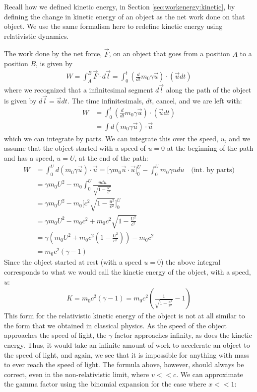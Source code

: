Recall how we defined kinetic energy, in Section \ref{sec:workenergy:kinetic}, by defining the change in kinetic energy of an object as the net work done on that object. We use the same formalism here to redefine kinetic energy using relativistic dynamics.

The work done by the net force, $\vec F$, on an object that goes from a position $A$ to a position $B$, is given by
\begin{align*}
W = \int_A^B \vec F\cdot d\vec l=\int_0^t \left(\frac{d}{dt}m_0\gamma\vec u \right)\cdot(\vec u dt)
\end{align*}
where we recognized that a infinitesimal segment $d\vec l$ along the path of the object is given by $d\vec l=\vec u dt$. The time infinitesimals, $dt$, cancel, and we are left with:
\begin{align*}
W&=\int_0^t \left(\frac{d}{dt}m_0\gamma\vec u \right)\cdot(\vec u dt)\\
&=\int d(m_0\gamma \vec u)\cdot \vec u
\end{align*}
which we can integrate by parts. We can integrate this over the speed, $u$, and we assume that the object started with a speed of $u=0$ at the beginning of the path and has a speed, $u=U$, at the end of the path:
\begin{align*}
W&=\int_0^U d(m_0\gamma \vec u)\cdot \vec u = \Big[\gamma m_0 \vec u\cdot\vec u\Big]_0^U-\int_0^U m_0\gamma u du\quad\text{(int. by parts)}\\
&=\gamma m_0 U^2-m_0\int_0^U\frac{udu}{\sqrt{1-\frac{u^2}{c^2}}}\\
&=\gamma m_0 U^2-m_0\Big[ c^2\sqrt{1-\frac{u^2}{c^2}} \Big]_0^U\\
&=\gamma m_0 U^2-m_0c^2+m_0c^2\sqrt{1-\frac{U^2}{c^2}}\\
&=\gamma \left(m_0 U^2+m_0c^2\left(1-\frac{U^2}{c^2}\right)\right)-m_0c^2\\
&=m_0c^2(\gamma -1)	
\end{align*}
Since the object started at rest (with a speed $u=0$) the above integral corresponds to what we would call the kinetic energy of the object, with a speed, $u$:
\begin{align*}
K=m_0c^2(\gamma -1)=m_0c^2\left(\frac{1}{\sqrt{1-\frac{u^2}{c^2}}}-1\right)
\end{align*}
This form for the relativistic kinetic energy of the object is not at all similar to the form that we obtained in classical physics. As the speed of the object approaches the speed of light, the $\gamma$ factor approaches infinity, as does the kinetic energy. Thus, it would take an infinite amount of work to accelerate an object to the speed of light, and again, we see that it is impossible for anything with mass to ever reach the speed of light. The formula above, however, should always be correct, even in the non-relativistic limit, where $v<<c$. We can approximate the gamma factor using the binomial expansion for the case where $x<<1$:
